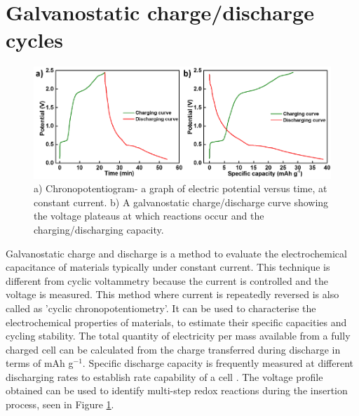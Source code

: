 \section{Galvanostatic charge/discharge cycles}
\begin{figure}[tbh!]
\centering
\includegraphics[width=\textwidth]{Figures/chap2fig/ChrononCDC}
\caption{a) Chronopotentiogram- a graph of electric potential versus time, at constant current. b) A galvanostatic charge/discharge curve showing the voltage plateaus at which reactions occur and the charging/discharging capacity.}
\label{Figures/chap2fig:ChrononCDC}
\end{figure}
Galvanostatic  charge and discharge  is  a  method  to  evaluate  the  electrochemical capacitance of materials typically under constant current. This technique is different from cyclic voltammetry because the current is controlled and the voltage is measured. This  method  where current is repeatedly reversed is  also  called  as  'cyclic chronopotentiometry'. It can be used to characterise the electrochemical properties of materials, to estimate their specific capacities and cycling stability. The total quantity of electricity per mass available from a fully charged cell can be calculated from the charge transferred during discharge in terms of mAh g$^{-1}$. Specific discharge capacity is frequently measured at different discharging rates to establish rate capability of a cell \cite{pyun_electrochemistry_2012-1}. The voltage profile obtained can be used to identify multi-step redox reactions during the insertion process, seen in Figure \ref{Figures/chap2fig:ChrononCDC}. 


